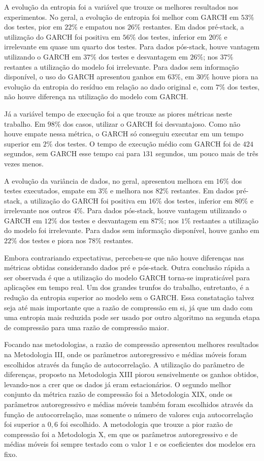 A evolução da entropia foi a variável que trouxe os melhores resultados nos
experimentos. No geral, a evolução de entropia foi melhor com GARCH em $53\%$
dos testes, pior em $22\%$ e empatou nos $26\%$ restantes. Em dados pré-stack, a
utilização do GARCH foi positiva em $56\%$ dos testes, inferior em $20\%$ e
irrelevante em quase um quarto dos testes. Para dados pós-stack, houve vantagem
utilizando o GARCH em $37\%$ dos testes e desvantagem em $26\%$; nos $37\%$
restantes a utilização do modelo foi irrelevante. Para dados sem informação
disponível, o uso do GARCH apresentou ganhos em $63\%$, em $30\%$ houve piora na
evolução da entropia do resíduo em relação ao dado original e, com $7\%$ dos
testes, não houve diferença na utilização do modelo com GARCH.

Já a variável tempo de execução foi a que trouxe as piores métricas neste
trabalho. Em $98\%$ dos casos, utilizar o GARCH foi desvantajoso. Como não houve
empate nessa métrica, o GARCH só conseguiu executar em um tempo superior em
$2\%$ dos testes. O tempo de execução médio com GARCH foi de $424$ segundos, sem
GARCH esse tempo cai para $131$ segundos, um pouco mais de três vezes menos.

A evolução da variância de dados, no geral, apresentou melhora em $16\%$ dos
testes executados, empate em $3\%$ e melhora nos $82\%$ restantes. Em dados
pré-stack, a utilização do GARCH foi positiva em $16\%$ dos testes, inferior em
$80\%$ e irrelevante nos outros $4\%$. Para dados pós-stack, houve vantagem
utilizando o GARCH em $12\%$ dos testes e desvantagem em $87\%$; nos $1\%$
restantes a utilização do modelo foi irrelevante. Para dados sem informação
disponível, houve ganho em $22\%$ dos testes e piora nos $78\%$ restantes.

Embora contrariando expectativas, percebeu-se que não houve diferenças nas
métricas obtidas considerando dados pré e pós-stack. Outra conclusão rápida a
ser observada é que a utilização do modelo GARCH torna-se impraticável para
aplicações em tempo real. Um dos grandes trunfos do trabalho, entretanto, é a
redução da entropia superior ao modelo sem o GARCH. Essa constatação talvez seja
até mais importante que a razão de compressão em si, já que um dado com uma
entropia mais reduzida pode ser usado por outro algoritmo na segunda etapa de
compressão para uma razão de compressão maior.

Focando nas metodologias, a razão de compressão apresentou melhores resultados
na Metodologia III, onde os parâmetros autoregressivo e médias móveis foram
escolhidos através da função de autocorrelação. A utilização do parâmetro de diferenças,
proposto na Metodologia XIII piorou sensivelmente os ganhos obtidos, levando-nos
a crer que os dados já eram estacionários. O segundo melhor conjunto da métrica razão de compressão foi a
Metodologia XIX, onde os parâmetros
autoregressivo e médias móveis também foram escolhidos através da função de
autocorrelação, mas somente o número de valores cuja autocorrelação foi
superior a $0,6$ foi escolhido. A metodologia que trouxe a pior razão de
compressão foi a Metodologia X, em que os
parâmetros autoregressivo e de médias móveis foi sempre testado com o valor $1$
e os coeficientes dos modelos era fixo.

